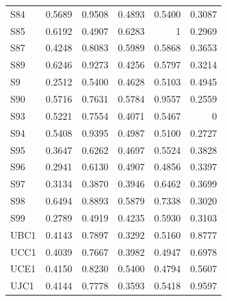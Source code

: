 \begin{longtable}{lrrrrr}
  S84 & 0.5689 & 0.9508 & 0.4893 & 0.5400 & 0.3087 \\
  S85 & 0.6192 & 0.4907 & 0.6283 & 1 & 0.2969 \\
  S87 & 0.4248 & 0.8083 & 0.5989 & 0.5868 & 0.3653 \\
  S89 & 0.6246 & 0.9273 & 0.4256 & 0.5797 & 0.3214 \\
  S9 & 0.2512 & 0.5400 & 0.4628 & 0.5103 & 0.4945 \\
  S90 & 0.5716 & 0.7631 & 0.5784 & 0.9557 & 0.2559 \\
  S93 & 0.5221 & 0.7554 & 0.4071 & 0.5467 & 0 \\
  S94 & 0.5408 & 0.9395 & 0.4987 & 0.5100 & 0.2727 \\
  S95 & 0.3647 & 0.6262 & 0.4697 & 0.5524 & 0.3828 \\
  S96 & 0.2941 & 0.6130 & 0.4907 & 0.4856 & 0.3397 \\
  S97 & 0.3134 & 0.3870 & 0.3946 & 0.6462 & 0.3699 \\
  S98 & 0.6494 & 0.8893 & 0.5879 & 0.7338 & 0.3020 \\
  S99 & 0.2789 & 0.4919 & 0.4235 & 0.5930 & 0.3103 \\
  UBC1 & 0.4143 & 0.7897 & 0.3292 & 0.5160 & 0.8777 \\
  UCC1 & 0.4039 & 0.7667 & 0.3982 & 0.4947 & 0.6978 \\
  UCE1 & 0.4150 & 0.8230 & 0.5400 & 0.4794 & 0.5607 \\
  UJC1 & 0.4144 & 0.7778 & 0.3593 & 0.5418 & 0.9597 \\
\end{longtable}
